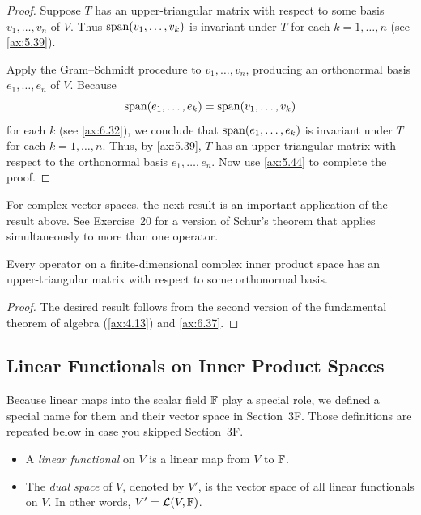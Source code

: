 \begin{proof}
Suppose $T$ has an upper-triangular matrix with respect to some basis
$v_1,\dots,v_n$ of $V$. Thus $\operatorname{span}(v_1,\dots,v_k)$ is invariant under $T$ for
each $k=1,\dots,n$ (see \ref{ax:5.39}).

Apply the Gram--Schmidt procedure to $v_1,\dots,v_n$, producing an orthonormal
basis $e_1,\dots,e_n$ of $V$. Because
\[ \operatorname{span}(e_1,\dots,e_k) = \operatorname{span}(v_1,\dots,v_k) \]
for each $k$ (see \ref{ax:6.32}), we conclude that $\operatorname{span}(e_1,\dots,e_k)$ is
invariant under $T$ for each $k=1,\dots,n$. Thus, by \ref{ax:5.39}, $T$ has an
upper-triangular matrix with respect to the orthonormal basis $e_1,\dots,e_n$.
Now use \ref{ax:5.44} to complete the proof.
\end{proof}

%
For complex vector spaces, the next result is an important application of the
result above. See Exercise~20 for a version of Schur's theorem that applies
simultaneously to more than one operator.

\begin{result}\label{ax:6.38}
Every operator on a finite-dimensional complex inner product space has an
upper-triangular matrix with respect to some orthonormal basis.
\end{result}

\begin{proof}
The desired result follows from the second version of the fundamental theorem of
algebra (\ref{ax:4.13}) and \ref{ax:6.37}.
\end{proof}

\subsection{Linear Functionals on Inner Product Spaces}

Because linear maps into the scalar field $\mathbb{F}$ play a special role, we defined a
special name for them and their vector space in Section~3F. Those definitions
are repeated below in case you skipped Section~3F.

\begin{definition}\label{ax:6.39}\leavevmode
\begin{itemize}
\item A \emph{linear functional} on $V$ is a linear map from $V$ to $\mathbb{F}$.
\item The \emph{dual space} of $V$, denoted by $V'$, is the vector space of all
  linear functionals on $V$. In other words, $V'=\mathcal{L}(V,\mathbb{F})$.
\end{itemize}
\end{definition}

